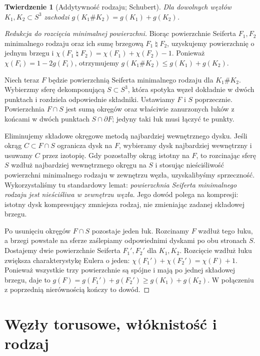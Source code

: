 \documentclass[11pt,a4paper]{report}
\numberwithin{equation}{section}
\theoremstyle{plain}
\newtheorem{twierdzenie}{Twierdzenie}[section]
\theoremstyle{definition}
\theoremstyle{remark}
\begin{document}
\begin{twierdzenie}[Addytywność rodzaju; Schubert]
Dla dowolnych węzłów $K_1,K_2\subset S^3$ zachodzi
$g(K_1\#K_2)=g(K_1)+g(K_2)$.
\end{twierdzenie}

\begin{proof}[Redukcja do rozcięcia minimalnej powierzchni]
Biorąc powierzchnie Seiferta $F_1,F_2$ minimalnego rodzaju
oraz ich sumę brzegową $F_1\mathbin{\natural}F_2$,
uzyskujemy powierzchnię o jednym brzegu i
$\chi(F_1\mathbin{\natural}F_2)=\chi(F_1)+\chi(F_2)-1$.
Ponieważ $\chi(F_i)=1-2g(F_i)$, otrzymujemy
$g(K_1\#K_2)\le g(K_1)+g(K_2)$.

Niech teraz $F$ będzie powierzchnią Seiferta minimalnego rodzaju
dla $K_1\#K_2$. Wybierzmy sferę dekomponującą
$S\subset S^3$, która spotyka węzeł dokładnie w dwóch
punktach i rozdziela odpowiednie składniki. Ustawiamy $F$
i $S$ poprzecznie. Powierzchnia $F\cap S$ jest sumą
okręgów oraz właściwie zanurzonych łuków z końcami w dwóch
punktach $S\cap\partial F$; jedyny taki łuk musi łączyć
te punkty.

Eliminujemy składowe okręgowe metodą najbardziej wewnętrznego
dysku. Jeśli okrąg $C\subset F\cap S$ ogranicza dysk na
$F$, wybieramy dysk najbardziej wewnętrzny i usuwamy
$C$ przez izotopię. Gdy pozostałby okrąg istotny na $F$,
to rozcinając sferę $S$ wzdłuż najbardziej wewnętrznego
okręgu na $S$ i stosując nieściśliwość powierzchni
minimalnego rodzaju w zewnętrzu węzła, uzyskalibyśmy
sprzeczność. Wykorzystaliśmy tu standardowy lemat:
\emph{powierzchnia Seiferta minimalnego rodzaju jest
nieściśliwa w zewnętrzu węzła}. Jego dowód polega na
kompresji: istotny dysk kompresujący zmniejsza rodzaj,
nie zmieniając zadanej składowej brzegu.

Po usunięciu okręgów $F\cap S$ pozostaje jeden łuk.
Rozcinamy $F$ wzdłuż tego łuku, a brzegi powstałe na
sferze zaślepiamy odpowiednimi dyskami po obu stronach
$S$. Dostajemy dwie powierzchnie Seiferta $F_1',F_2'$
dla $K_1,K_2$. Rozcięcie wzdłuż łuku zwiększa
charakterystykę Eulera o jeden:
$\chi(F_1')+\chi(F_2')=\chi(F)+1$.
Ponieważ wszystkie trzy powierzchnie są spójne i mają
po jednej składowej brzegu, daje to
$g(F)=g(F_1')+g(F_2')\ge g(K_1)+g(K_2)$.
W połączeniu z poprzednią nierównością kończy to dowód.
\end{proof}

\section{Węzły torusowe, włóknistość i rodzaj}
\label{sec:kt-torusowe}
\end{document}
